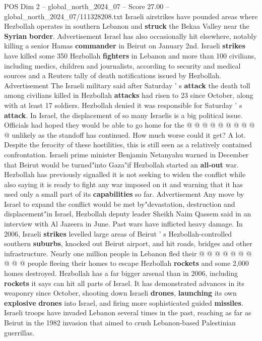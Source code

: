 \begin{textsample}{POS Dim 2 – global\_north\_2024\_07 – Score 27.00 – global\_north\_2024\_07/111328208.txt}
Israeli airstrikes have pounded areas where Hezbollah operates in southern Lebanon and \textbf{struck} the Bekaa Valley near the \textbf{Syrian} \textbf{border}.
Advertisement Israel has also occasionally hit elsewhere, notably killing a senior Hamas \textbf{commander} in Beirut on January 2nd.
Israeli \textbf{strikes} have killed some 350 Hezbollah \textbf{fighters} in Lebanon and more than 100 civilians, including medics, children and journalists, according to security and medical sources and a Reuters tally of death notifications issued by Hezbollah.
Advertisement The Israeli military said after Saturday ' s \textbf{attack} the death toll among civilians killed in Hezbollah \textbf{attacks} had risen to 23 since October, along with at least 17 soldiers.
Hezbollah denied it was responsible for Saturday ' s \textbf{attack}.
In Israel, the displacement of so many Israelis is a big political issue.
Officials had hoped they would be able to go home for the @ @ @ @ @ @ @ @ @ @ unlikely as the standoff has continued.
How much worse could it get?
A lot.
Despite the ferocity of these hostilities, this is still seen as a relatively contained confrontation.
Israeli prime minister Benjamin Netanyahu warned in December that Beirut would be turned"into Gaza"if Hezbollah started an \textbf{all-out} war.
Hezbollah has previously signalled it is not seeking to widen the conflict while also saying it is ready to fight any war imposed on it and warning that it has used only a small part of its \textbf{capabilities} so far.
Advertisement Any move by Israel to expand the conflict would be met by"devastation, destruction and displacement"in Israel, Hezbollah deputy leader Sheikh Naim Qassem said in an interview with Al Jazeera in June.
Past wars have inflicted heavy damage.
In 2006, Israeli \textbf{strikes} levelled large areas of Beirut ' s Hezbollah-controlled southern \textbf{suburbs}, knocked out Beirut airport, and hit roads, bridges and other infrastructure.
Nearly one million people in Lebanon fled their @ @ @ @ @ @ @ @ @ @ people fleeing their homes to escape Hezbollah \textbf{rockets} and some 2,000 homes destroyed.
Hezbollah has a far bigger arsenal than in 2006, including \textbf{rockets} it says can hit all parts of Israel.
It has demonstrated advances in its weaponry since October, shooting down Israeli \textbf{drones}, \textbf{launching} its own \textbf{explosive} \textbf{drones} into Israel, and firing more sophisticated guided \textbf{missiles}.
Israeli troops have invaded Lebanon several times in the past, reaching as far as Beirut in the 1982 invasion that aimed to crush Lebanon-based Palestinian guerrillas.

\end{textsample}
